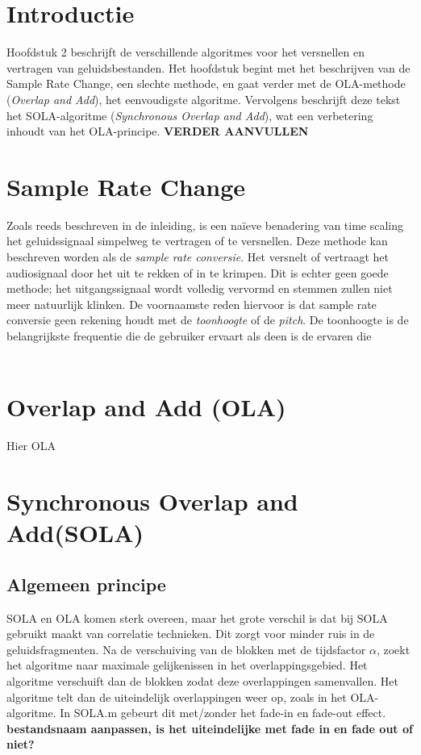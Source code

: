 \documentclass[12pt]{report}
\begin{document}
\section{Introductie}
Hoofdstuk 2 beschrijft de verschillende algoritmes voor het versnellen en vertragen van geluidsbestanden. Het hoofdstuk begint met het beschrijven van de Sample Rate Change, een slechte methode, en gaat verder met de OLA-methode (\textit{Overlap and Add}), het eenvoudigste algoritme. Vervolgens beschrijft deze tekst het SOLA-algoritme (\textit{Synchronous Overlap and Add}), wat een verbetering inhoudt van het OLA-principe. 
\textbf{VERDER AANVULLEN}

\section{Sample Rate Change}
Zoals reeds beschreven in de inleiding, is een na\"{i}eve benadering van time scaling het geluidssignaal simpelweg te vertragen of te versnellen. Deze methode kan beschreven worden als de \textit{sample rate conversie}. Het versnelt of vertraagt het audiosignaal door het uit te rekken of in te krimpen. Dit is echter geen goede methode; het uitgangssignaal wordt volledig vervormd en stemmen zullen niet meer natuurlijk klinken. De voornaamste reden hiervoor is dat sample rate conversie geen rekening houdt met de \textit{toonhoogte} of de \textit{pitch}. De toonhoogte is de belangrijkste frequentie die de gebruiker ervaart als deen is de ervaren die    \\
\\

\section{Overlap and Add (OLA)}
Hier OLA

\section{Synchronous Overlap and Add(SOLA)}

\subsection{Algemeen principe}
SOLA en OLA komen sterk overeen, maar het grote verschil is dat bij SOLA gebruikt maakt van correlatie technieken. Dit zorgt voor  minder ruis in de geluidsfragmenten. Na de verschuiving van de blokken met de tijdsfactor $\alpha$, zoekt het algoritme naar maximale gelijkenissen in het overlappingsgebied. Het algoritme verschuift dan de blokken zodat deze overlappingen samenvallen. Het algoritme telt dan de uiteindelijk overlappingen weer op, zoals in het OLA-algoritme. In SOLA.m gebeurt dit met/zonder het fade-in en fade-out effect.
\textbf{bestandsnaam aanpassen, is het uiteindelijke met fade in en fade out of niet?}
\end{document}

